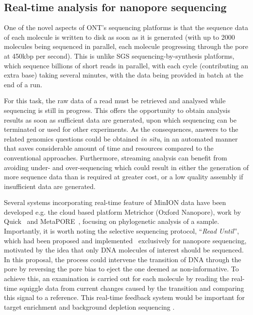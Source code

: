 \subsection{Real-time analysis for nanopore sequencing}
One of the novel aspects of ONT's sequencing platforms is that the sequence data of each molecule is written to disk as soon as it is generated (with up to 2000 molecules being sequenced in parallel, each molecule progressing through the pore at 450kbp per second).    This is unlike SGS sequencing-by-synthesis platforms, which sequence billions of short reads in parallel, with each cycle (contributing an extra base) taking several minutes, with the data being provided in batch at the end of a run.

For this task, the raw data of a read must be retrieved and analysed while sequencing is still in progress. This offers the opportunity to obtain analysis results as soon as sufficient data are generated, upon which sequencing can be terminated or used for other experiments.
As the consequences, answers to the related genomics questions could be obtained \emph{in situ}, in an automated manner that saves considerable amount of time and resources compared to the conventional approaches.
Furthermore, streaming analysis can benefit from avoiding under- and over-sequencing which could result in either the generation of more sequence data than is required at greater cost, or a low quality assembly if insufficient data are generated. 

Several systems incorporating real-time feature of MinION data have been developed e.g. the cloud based platform Metrichor (Oxford Nanopore), work by Quick\etal{}~\cite{QuickAC2015} and MetaPORE~\cite{GreningerNF2015}, focusing on phylogenetic analysis of a sample. 
Importantly, it is worth noting the selective sequencing protocol, \IE{}``\emph{Read Until}'', which had been proposed and implemented~\cite{LooseMS2016} exclusively for nanopore sequencing, motivated by the idea that only DNA molecules of interest should be sequenced. In this proposal, the process could intervene the transition of DNA through the pore by reversing the pore bias to eject the one deemed as non-informative. To achieve this, an examination is carried out for each molecule by reading the real-time squiggle data from current changes caused by the transition and comparing this signal to a reference. This real-time feedback system would be important for target enrichment and background depletion sequencing \cite{Edwards2018real}. 

